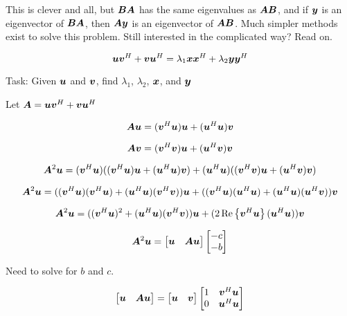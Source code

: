\documentclass{article}
\begin{document}
This is clever and all, but $\bm{B}\bm{A}$ has the same eigenvalues as $\bm{A}\bm{B}$, and if $\bm{y}$ is an eigenvector of $\bm{B}\bm{A}$, then $\bm{A}\bm{y}$ is an eigenvector of $\bm{A}\bm{B}$. Much simpler methods exist to solve this problem. Still interested in the complicated way? Read on.


\begin{equation}
\bm{u}\bm{v}^H + \bm{v}\bm{u}^H = \lambda_1 \bm{x}\bm{x}^H + \lambda_2 \bm{y}\bm{y}^H
\end{equation}

Task:
Given $\bm{u}$ and $\bm{v}$, find $\lambda_1$, $\lambda_2$, $\bm{x}$, and $\bm{y}$

Let $\bm{A} = \bm{u}\bm{v}^H + \bm{v}\bm{u}^H$

\begin{equation}
\bm{A}\bm{u} = (\bm{v}^H\bm{u})\bm{u} + (\bm{u}^H\bm{u})\bm{v}
\end{equation}

\begin{equation}
\bm{A}\bm{v} = (\bm{v}^H\bm{v})\bm{u} + (\bm{u}^H\bm{v})\bm{v}
\end{equation}

\begin{equation}
\bm{A}^2\bm{u} = (\bm{v}^H\bm{u})((\bm{v}^H\bm{u})\bm{u} + (\bm{u}^H\bm{u})\bm{v}) + (\bm{u}^H\bm{u})((\bm{v}^H\bm{v})\bm{u} + (\bm{u}^H\bm{v})\bm{v})
\end{equation}

\begin{equation}
\bm{A}^2\bm{u} = ((\bm{v}^H\bm{u})(\bm{v}^H\bm{u}) + (\bm{u}^H\bm{u})(\bm{v}^H\bm{v}))\bm{u} + ((\bm{v}^H\bm{u})(\bm{u}^H\bm{u}) + (\bm{u}^H\bm{u})(\bm{u}^H\bm{v}))\bm{v}
\end{equation}

\begin{equation}
\bm{A}^2\bm{u} = ((\bm{v}^H\bm{u})^2 + (\bm{u}^H\bm{u})(\bm{v}^H\bm{v}))\bm{u} + (2\operatorname{Re}\left\{\bm{v}^H\bm{u}\right\}(\bm{u}^H\bm{u}))\bm{v}
\end{equation}

\begin{equation}
\bm{A}^2\bm{u} = \begin{bmatrix} \bm{u} & \bm{A}\bm{u} \end{bmatrix} \begin{bmatrix} -c \\ -b \end{bmatrix}
\end{equation}

Need to solve for $b$ and $c$.

\begin{equation}
\begin{bmatrix}
\bm{u} & \bm{A}\bm{u}
\end{bmatrix} =
\begin{bmatrix}
\bm{u} & \bm{v}
\end{bmatrix}
\begin{bmatrix}
1 & \bm{v}^H\bm{u}\\
0 & \bm{u}^H\bm{u}
\end{bmatrix}
\end{equation}
\end{document}
